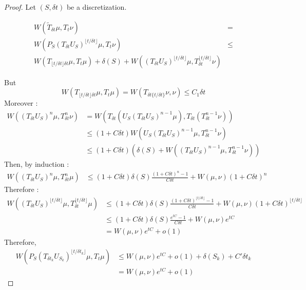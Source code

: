 \documentclass{article}
\begin{document}
\begin{proof}
  Let $(S,\delta t)$ be a discretization.


  \begin{align}
    W(\tilde T_{\delta t}\mu, T_{t}\nu) &= \\
  W(P_{S}(T_{\delta t}U_{S})^{\lfloor t/\delta t\rfloor}\mu , T_{t}\nu) &\leq \\ W(T_{\lfloor t/\delta t\rfloor \delta t}\mu, T_{t}\mu) + \delta(S) + W((T_{\delta t}U_{S})^{\lfloor t/\delta t\rfloor}\mu , T_{\delta t}^{\lfloor t/\delta t\rfloor}\nu)
  \end{align}
  
  But
  \begin{equation}
  W(T_{\lfloor t/\delta t\rfloor \delta t}\mu, T_{t}\mu) = W(T_{\delta t\{t/\delta t\}}\nu , \nu) \leq C_{1}\delta t
\end{equation}
Moreover :
\begin{align}
  W((T_{\delta t}U_{S})^{n}\mu , T_{\delta t}^{n}\nu) &= W(T_{\delta t}\left(U_{S}(T_{\delta t}U_{S})^{n-1}\mu\right) , T_{\delta t}\left(T_{\delta t}^{n-1}\nu\right)) \\
                                                      &\leq (1+C\delta t)  W(U_{S}(T_{\delta t}U_{S})^{n-1}\mu , T_{\delta t}^{n-1}\nu)\\
  & \leq (1+C\delta t)  (\delta(S) + W((T_{\delta t}U_{S})^{n-1}\mu , T_{\delta t}^{n-1}\nu))
\end{align}
Then, by induction :
\begin{align}
  W((T_{\delta t}U_{S})^{n}\mu , T_{\delta t}^{n}\mu) &\leq (1+C\delta t)\delta(S)\frac{(1+C\delta t)^{n} - 1}{C\delta t} + W(\mu, \nu)(1+C\delta t)^{n}
\end{align}
Therefore :
\begin{align}
  W((T_{\delta t}U_{S})^{\lfloor t/\delta t\rfloor}\mu , T_{\delta t}^{\lfloor t/\delta t\rfloor}\mu) &\leq (1+C\delta t)\delta(S)\frac{(1+C\delta t)^{\lfloor t/\delta t\rfloor} - 1}{C\delta t} + W(\mu, \nu)(1+C\delta t)^{\lfloor t/\delta t\rfloor} \\
                                                                                                      &\leq (1+C\delta t)\delta(S)\frac{e^{tC} - 1}{C\delta t} + W(\mu, \nu)e^{tC}\\
                                                                                                        &= W(\mu, \nu)e^{tC} + o(1)
\end{align}
Therefore, 
\begin{align}
  W(P_{S}(T_{\delta t_{k}}U_{S_{k}})^{\lfloor t/\delta t_{k}\rfloor}\mu, T_{t}\mu) & \leq W(\mu, \nu)e^{tC} + o(1) + \delta(S_{k}) + C'\delta t_{k}  \\
  &= W(\mu, \nu)e^{tC} + o(1)
\end{align}
\end{proof}
\end{document}
